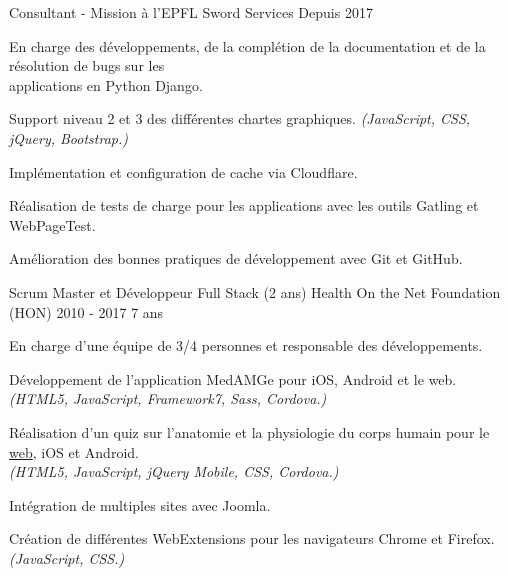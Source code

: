 
\begin{cventries}

  \cventry
    {Consultant - Mission à l'EPFL}
    {Sword Services}
    {Depuis 2017}
    {}
    {
      \begin{cvitems}
        \item En charge des développements, de la complétion de la
          documentation et de la résolution de bugs sur les \\applications en
          Python Django.
        \item Support niveau 2 et 3 des différentes chartes graphiques.
          \textit{(JavaScript, CSS, jQuery, Bootstrap.)}
        \item Implémentation et configuration de cache via Cloudflare.
        \item Réalisation de tests de charge pour les applications avec
          les outils Gatling et WebPageTest.
        \item Amélioration des bonnes pratiques de développement avec Git et
          GitHub.
      \end{cvitems}
    }

  \cventry
    {Scrum Master et Développeur Full Stack (2 ans)}
    {Health On the Net Foundation (HON)}
    {2010 - 2017}
    {7 ans}
    {
      \begin{cvitems}
        \item En charge d'une équipe de 3/4 personnes et responsable des
          développements.
        \item Développement de l'application MedAMGe pour iOS, Android et
          le web.\\
            \textit{(HTML5, JavaScript, Framework7, Sass, Cordova.)}
        \item Réalisation d'un quiz sur l'anatomie et la physiologie du corps
          humain pour le
          {\color{awesome-skyblue}
            \href{https://www.santeromande.ch/Game/}{web}}, iOS et Android.\\
          \textit{(HTML5, JavaScript, jQuery Mobile, CSS, Cordova.)}
        \item Intégration de multiples sites avec Joomla.
        \item Création de différentes WebExtensions pour les navigateurs
          Chrome et Firefox. \textit{(JavaScript, CSS.)}
      \end{cvitems}
    }


\end{cventries}
